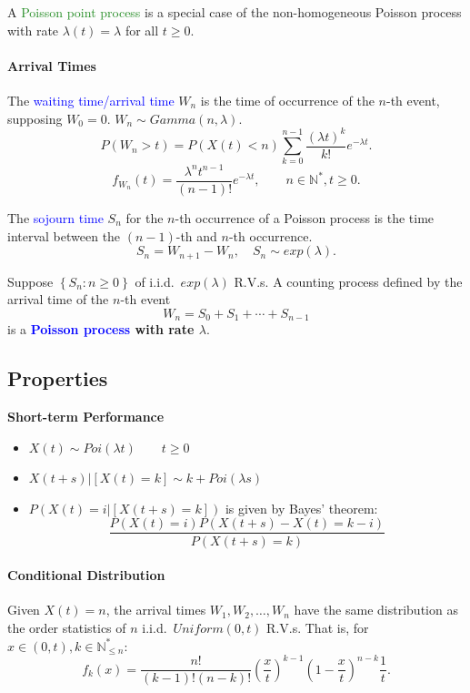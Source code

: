 A \textcolor{ForestGreen}{Poisson point process} is a special case of the
non-homogeneous Poisson process with rate $\lambda\left( t \right) =\lambda$
for all $t\ge 0$.

\paragraph{Arrival Times}
The \textcolor{Blue}{waiting time/arrival time} $W_n$ is the time of occurrence
of the $n$-th event, supposing $W_0=0$. $W_{n}\sim Gamma \left( n,\lambda \right) $.
\[P\left( W_{n}>t \right)=P\left( X\left( t \right) <n \right) \sum_{k=0}^{n-1}
\frac{{\left( \lambda t \right) }^{k}}{k\mathpunct{!}}e^{-\lambda t}.\] 
\[f_{W_{n}}\left( t \right) =\frac{\lambda^{n}t^{n-1}}{\left( n-1 \right)
\mathpunct{!}}e^{-\lambda t}, \qquad n\in \mathbb{N}^{*}, t\ge 0.\] 

The \textcolor{Blue}{sojourn time} $S_n$ for the $n$-th occurrence of a Poisson
process is the time interval between the $(n-1)$-th and $n$-th occurrence.
\[S_{n}=W_{n+1}-W_{n},\quad S_{n}\sim exp\left( \lambda \right).\]

Suppose $\left\{ S_{n}:n\ge 0 \right\} $ of i.i.d.\ $exp\left( \lambda \right)$ R.V.s.
A counting process defined by the arrival time of the $n$-th event
\[W_{n}=S_0+S_1+\cdots+S_{n-1}\] 
is a \textbf{\textcolor{Blue}{Poisson process} with rate $\lambda$}.

\subsection{Properties}
\textbf{Short-term Performance}
\begin{itemize}
  \item $X\left( t \right) \sim Poi \left( \lambda t \right)\qquad t\ge 0$
  \item $X\left( t+s \right) |\left[ X\left( t \right) =k \right] \sim k + Poi\left( \lambda s \right) $ 
  \item $P\left( X\left( t \right)=i| \left[ X\left( t+s \right) =k \right] \right)  $ is given by Bayes' theorem:
    \[\frac{P\left( X\left( t \right) =i \right) P\left( X\left( t+s \right) -X\left( t \right) =k-i \right) }{P\left( X\left( t+s \right) =k \right) }\]
\end{itemize}

\paragraph{Conditional Distribution}
Given $X\left( t \right) =n$, the arrival times $W_1,W_2,\ldots,W_{n}$ have the
same distribution as the \textcolor{Bittersweet}{order statistics} of $n$
i.i.d.\ $Uniform\left( 0,t \right)$ R.V.s. That is, for $x\in \left( 0,t
\right), k\in \mathbb{N}^{*}_{\le n}$:
\[f_k\left( x \right) =\frac{n!}{\left( k-1 \right) \mathpunct{!}\left( n-k
\right) \mathpunct{!}}\left( \frac{x}{t} \right) ^{k-1}\left( 1-\frac{x}{t}
\right) ^{n-k}\frac{1}{t}.\]

